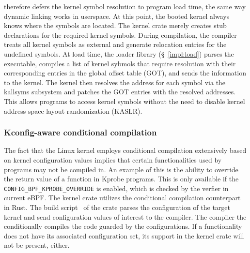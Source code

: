 \projname{} therefore defers the kernel symbol resolution to program load time,
    the same way dynamic linking works in userspace.
At this point, the booted kernel always knows where the symbols are located.
The \projname{} kernel crate merely creates stub declarations for the required
    kernel symbols.
During compilation, the compiler treats all kernel symbols as external and
    generate relocation entries for the undefined symbols.
At load time, the loader library (\S~\ref{impl:load}) parses the executable,
    compiles a list of kernel sybmols that require resolution with their
    corresponding entries in the global offset table (GOT), and sends the
    information to the kernel.
The kernel then resolves the address for each symbol via the kallsyms subsystem
    and patches the GOT entries with the resolved addresses.
This allows programs to access kernel symbols without the need to disable
    kernel address space layout randomization (KASLR).

\subsubsection{Kconfig-aware conditional compilation}
The fact that the Linux kernel employs conditional compilation extensively
    based on kernel configuration values implies that certain functionalities
    used by \projname{} programs may not be compiled in.
An example of this is the ability to override the return value of a function in
    Kprobe programs.
This is only available if the \texttt{CONFIG\_BPF\_KPROBE\_OVERRIDE} is
    enabled, which is checked by the verfier in current eBPF.
The \projname{} kernel crate utilizes the conditional compilation counterpart
    in Rust.
The build script~\cite{rust-build-script} of the crate parses the configuration
    of the target kernel and send configuration values of interest to the
    compiler.
The compiler the conditionally compiles the code guarded by the configurations.
If a functionality does not have its associated configuration set, its support
    in the kernel crate will not be present, either.


